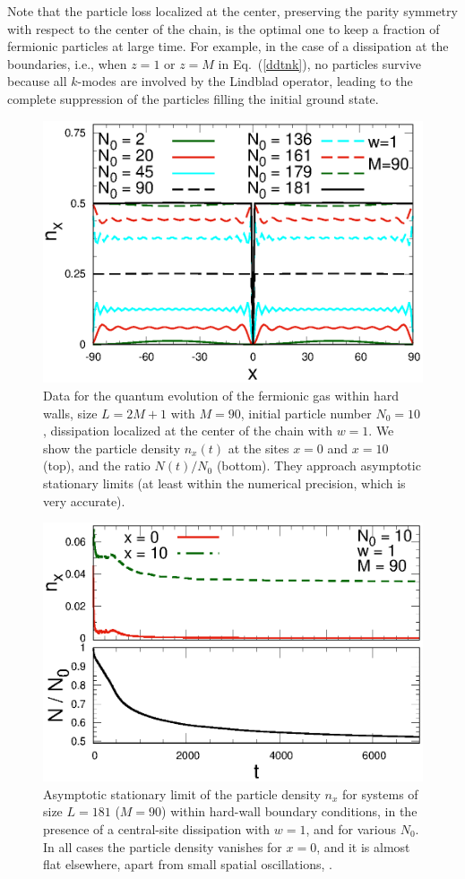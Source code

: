   Note that the particle loss localized at the center, preserving the
  parity symmetry with respect to the center of the chain, is the
  optimal one to keep a fraction of fermionic particles at large time.
  For example, in the case of a dissipation at the boundaries, i.e.,
  when $z=1$ or $z=M$ in Eq.~(\ref{ddtnk}), no particles survive because
  all $k$-modes are involved by the Lindblad operator, leading to the
  complete suppression of the particles filling the initial ground
  state.
  
  \begin{figure}[!htb]
\centering
    \includegraphics[width=0.65\columnwidth]{imm/nxhwall.eps}
    \caption{Data for the quantum evolution of the fermionic gas within
      hard walls, size $L=2M+1$ with $M=90$, initial particle number
      $N_0=10$, dissipation localized at the center of the chain with
      $w=1$. We show the particle density $n_x(t)$ at the sites $x=0$
      and $x=10$ (top), and the ratio $N(t)/N_0$ (bottom).  They
      approach asymptotic stationary limits (at least within the
      numerical precision, which is very accurate).}
    \label{nxdiffn0time}
  \end{figure}
  
  
  \begin{figure}[!htb]
\centering
    \includegraphics[width=0.65\columnwidth]{imm/nxNo.eps}
    \caption{Asymptotic stationary limit of the particle density $n_x$
      for systems of size $L=181$ ($M=90$) within hard-wall boundary
      conditions, in the presence of a central-site dissipation with
      $w=1$, and for various $N_0$. In all cases the particle density
      vanishes for $x=0$, and it is almost flat elsewhere, apart from
      small spatial oscillations, .  }
    \label{nxdiffn0}
  \end{figure}
  
